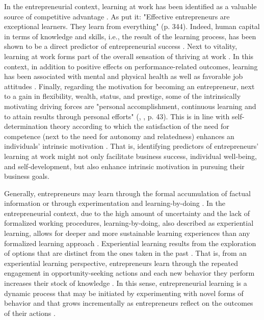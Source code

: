 \documentclass[man, 12pt, a4paper, noextraspace]{apa6}
\begin{document}
In the entrepreneurial context, learning at work has been identified as a valuable source of competitive advantage \parencite{Hatch2004}. 
As \textcite{Smilor1997} put it: "Effective entrepreneurs are exceptional learners. They learn from everything" (p. 344). 
Indeed, human capital in terms of knowledge and skills, i.e., the result of the learning process, has been shown to be a direct predictor of entrepreneurial success \parencite{Unger.2011}.
Next to vitality, learning at work forms part of the overall sensation of thriving at work \parencite{Spreitzer.2005b}.
In this context, in addition to positive effects on performance-related outcomes, learning has been associated with mental and physical health as well as favorable job attitudes \parencite{Kleine.2019}.  
Finally, regarding the motivation for becoming an entrepreneur, next to a gain in flexibility, wealth, status, and prestige, some of the intrinsically motivating driving forces are "personal accomplishment, continuous learning and to attain results through personal efforts" (\citeauthor{Jayawarna2013}, \citeyear{Jayawarna2013}, p. 43). 
This is in line with self-determination theory according to which the satisfaction of the need for competence (next to the need for autonomy and relatedness) enhances an individuals' intrinsic motivation \parencite{Ryan.2000c}.  
That is, identifying predictors of entrepreneurs' learning at work might not only facilitate business success, individual well-being, and self-development, but also enhance intrinsic motivation in pursuing their business goals. \par 

Generally, entrepreneurs may learn through the formal accumulation of factual information or through experimentation and learning-by-doing \parencite[e.g.,][]{Cope.2000}.
In the entrepreneurial context, due to the high amount of uncertainty and the lack of formalized working procedures, learning-by-doing, also described as experiential learning, allows for deeper and more sustainable learning experiences than any formalized learning approach \parencite[e.g.,][]{Minniti.2001, Cope.2000, Chang2014}. 
Experiential learning results from the exploration of options that are distinct from the ones taken in the past \parencite{Minniti.2001}. 
That is, from an experiential learning perspective, entrepreneurs learn through the repeated engagement in opportunity-seeking actions and each new behavior they perform increases their stock of knowledge \parencite{Holcomb2009}. 
In this sense, entrepreneurial learning is a dynamic process that may be initiated by experimenting with novel forms of behavior and that grows incrementally as entrepreneurs reflect on the outcomes of their actions \parencite{Cope.2000}. \par 
\end{document}
